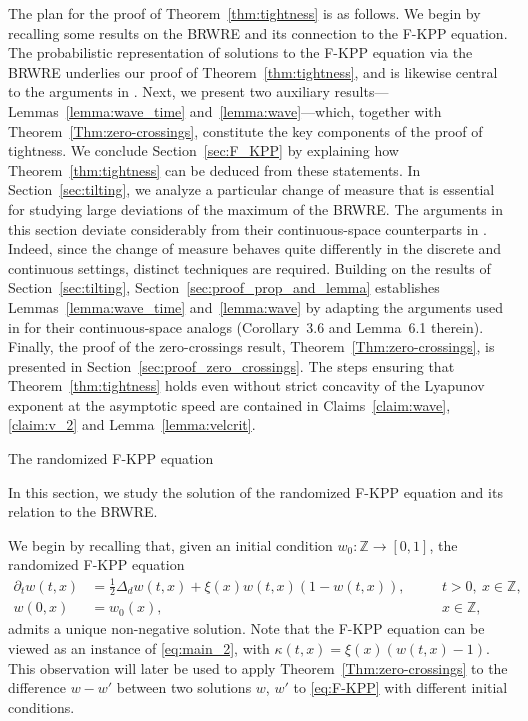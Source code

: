 \documentclass[12pt,reqno,oneside]{amsart}
\makeatletter
\numberwithin{equation}{section}
\renewcommand\subsection{\@startsection{subsection}{2}%
  \z@{-.5\linespacing\@plus-.7\linespacing}{.5\linespacing}%
  {\normalfont\scshape}}
\theoremstyle{definition}
\theoremstyle{remark}
\newcommand{\Z}{\mathbb{Z}}
\makeatother
\begin{document}
The plan for the proof of Theorem~\ref{thm:tightness} is as follows. We begin
by recalling some results on the BRWRE and its connection to the F-KPP
equation. The probabilistic representation of solutions to the F-KPP equation
via the BRWRE underlies our proof of Theorem~\ref{thm:tightness}, and is
likewise central to the arguments in \cite{CDO25}. Next, we present two
auxiliary results---Lemmas~\ref{lemma:wave_time}
and~\ref{lemma:wave}---which, together with Theorem~\ref{Thm:zero-crossings},
constitute the key components of the proof of tightness. We conclude
Section~\ref{sec:F_KPP} by explaining how Theorem~\ref{thm:tightness} can be
deduced from these statements. In Section~\ref{sec:tilting}, we analyze a
particular change of measure that is essential for studying large deviations
of the maximum of the BRWRE. The arguments in this section deviate
considerably from their continuous-space counterparts in \cite{CDO25}.
Indeed, since the change of measure behaves quite differently in the discrete
and continuous settings, distinct techniques are required. Building on the
results of Section~\ref{sec:tilting}, Section~\ref{sec:proof_prop_and_lemma}
establishes Lemmas~\ref{lemma:wave_time} and~\ref{lemma:wave} by adapting the
arguments used in \cite{CDO25} for their continuous-space analogs
(Corollary~3.6 and Lemma~6.1 therein). Finally, the proof of the
zero-crossings result, Theorem~\ref{Thm:zero-crossings}, is presented in
Section~\ref{sec:proof_zero_crossings}. The steps ensuring that
Theorem~\ref{thm:tightness} holds even without strict concavity of the
Lyapunov exponent at the asymptotic speed are contained in
Claims~\ref{claim:wave}, \ref{claim:v_2} and Lemma~\ref{lemma:velcrit}.


\subsection{The randomized F-KPP equation}

In this section, we study the solution of the randomized F-KPP equation and
its relation to the BRWRE.

We begin by recalling that, given an initial condition
$w_0: \Z \rightarrow [0,1]$, the randomized F-KPP equation
\begin{equation}
  \label{eq:F-KPP}
  \begin{aligned}
    \partial_t w(t,x)
    &= \frac{1}{2} \Delta_d w(t,x) + \xi(x)w(t,x)(1-w(t,x)), \quad
    &&t > 0, \ x \in \Z,
    \\ w(0,x)&=w_0(x),  &&x \in \Z,
  \end{aligned}
\end{equation}
admits a unique non-negative solution.
Note that the F-KPP equation can be viewed as an instance of
\eqref{eq:main_2}, with $\kappa(t,x)=\xi(x)(w(t,x)-1)$. This observation will
later be used to apply Theorem~\ref{Thm:zero-crossings} to the difference
$w-w'$ between two solutions $w$, $w'$ to \eqref{eq:F-KPP} with different
initial conditions.
\end{document}
